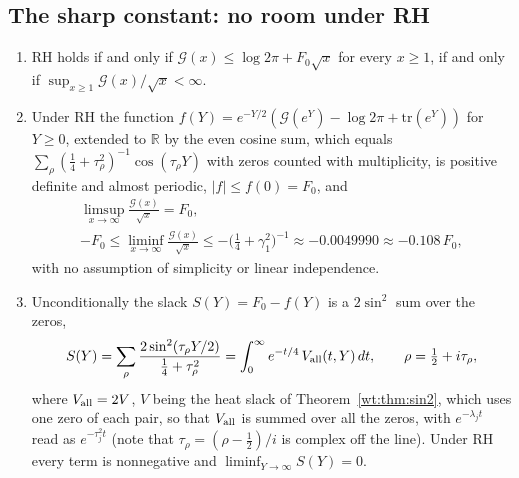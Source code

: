 \subsection{The sharp constant: no room under RH}

\begin{theorem}\label{qt:thm:sharp}
\begin{enumerate}
\item RH holds if and only if $\mathcal G(x)\le\log2\pi+F_0\sqrt x$ for every $x\ge1$, if and only if $\sup_{x\ge1}\mathcal G(x)/\sqrt x<\infty$.
\item Under RH the function $f(Y)=e^{-Y/2}(\mathcal G(e^Y)-\log2\pi+\mathrm{tr}(e^Y))$ for $Y\ge0$, extended to $\mathbb R$ by the even cosine sum, which equals $\sum_\rho(\tfrac14+\tau_\rho^2)^{-1}\cos(\tau_\rho Y)$ with zeros counted with multiplicity, is positive definite and almost periodic, $|f|\le f(0)=F_0$, and
\begin{gather*}
\limsup_{x\to\infty}\frac{\mathcal G(x)}{\sqrt x}=F_0,\\-F_0\le\liminf_{x\to\infty}\frac{\mathcal G(x)}{\sqrt x}\le-\Big(\frac14+\gamma_1^2\Big)^{-1}\approx-0.0049990\approx-0.108\,F_0,
\end{gather*}
with no assumption of simplicity or linear independence.
\item Unconditionally the slack $S(Y)=F_0-f(Y)$ is a $2\sin^2$ sum over the zeros,
\[
S(Y)=\sum_\rho\frac{2\sin^2(\tau_\rho Y/2)}{\tfrac14+\tau_\rho^2}=\int_0^\infty e^{-t/4}\,V_{\rm all}(t,Y)\,dt,\qquad\rho=\tfrac12+i\tau_\rho,
\]
where $V_{\rm all}=2V$, $V$ being the heat slack of Theorem~\ref{wt:thm:sin2}, which uses one zero of each pair, so that $V_{\rm all}$ is summed over all the zeros, with $e^{-\lambda_jt}$ read as $e^{-\tau_j^2t}$ (note that $\tau_\rho=(\rho-\tfrac12)/i$ is complex off the line). Under RH every term is nonnegative and $\liminf_{Y\to\infty}S(Y)=0$.
\end{enumerate}
\end{theorem}

